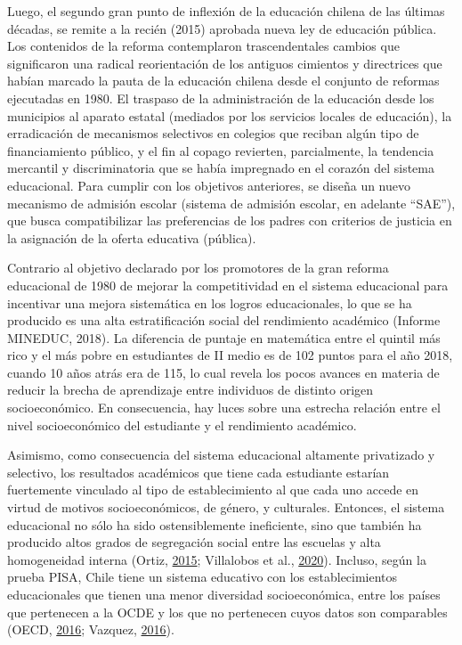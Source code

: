 \documentclass[
]{article}
\begin{document}
Luego, el segundo gran punto de inflexión de la educación chilena de las
últimas décadas, se remite a la recién (2015) aprobada nueva ley de
educación pública. Los contenidos de la reforma contemplaron
trascendentales cambios que significaron una radical reorientación de
los antiguos cimientos y directrices que habían marcado la pauta de la
educación chilena desde el conjunto de reformas ejecutadas en 1980. El
traspaso de la administración de la educación desde los municipios al
aparato estatal (mediados por los servicios locales de educación), la
erradicación de mecanismos selectivos en colegios que reciban algún tipo
de financiamiento público, y el fin al copago revierten, parcialmente,
la tendencia mercantil y discriminatoria que se había impregnado en el
corazón del sistema educacional. Para cumplir con los objetivos
anteriores, se diseña un nuevo mecanismo de admisión escolar (sistema de
admisión escolar, en adelante ``SAE''), que busca compatibilizar las
preferencias de los padres con criterios de justicia en la asignación de
la oferta educativa (pública).

Contrario al objetivo declarado por los promotores de la gran reforma
educacional de 1980 de mejorar la competitividad en el sistema
educacional para incentivar una mejora sistemática en los logros
educacionales, lo que se ha producido es una alta estratificación social
del rendimiento académico (Informe MINEDUC, 2018). La diferencia de
puntaje en matemática entre el quintil más rico y el más pobre en
estudiantes de II medio es de 102 puntos para el año 2018, cuando 10
años atrás era de 115, lo cual revela los pocos avances en materia de
reducir la brecha de aprendizaje entre individuos de distinto origen
socioeconómico. En consecuencia, hay luces sobre una estrecha relación
entre el nivel socioeconómico del estudiante y el rendimiento académico.

Asimismo, como consecuencia del sistema educacional altamente
privatizado y selectivo, los resultados académicos que tiene cada
estudiante estarían fuertemente vinculado al tipo de establecimiento al
que cada uno accede en virtud de motivos socioeconómicos, de género, y
culturales. Entonces, el sistema educacional no sólo ha sido
ostensiblemente ineficiente, sino que también ha producido altos grados
de segregación social entre las escuelas y alta homogeneidad interna
(Ortiz, \protect\hyperlink{ref-ortiz_escuelas_2015}{2015}; Villalobos et
al., \protect\hyperlink{ref-villalobos_composicion_2020}{2020}).
Incluso, según la prueba PISA, Chile tiene un sistema educativo con los
establecimientos educacionales que tienen una menor diversidad
socioeconómica, entre los países que pertenecen a la OCDE y los que no
pertenecen cuyos datos son comparables (OECD,
\protect\hyperlink{ref-oecd_pisa_2016}{2016}; Vazquez,
\protect\hyperlink{ref-vazquez_segregacion_2016}{2016}).
\end{document}
